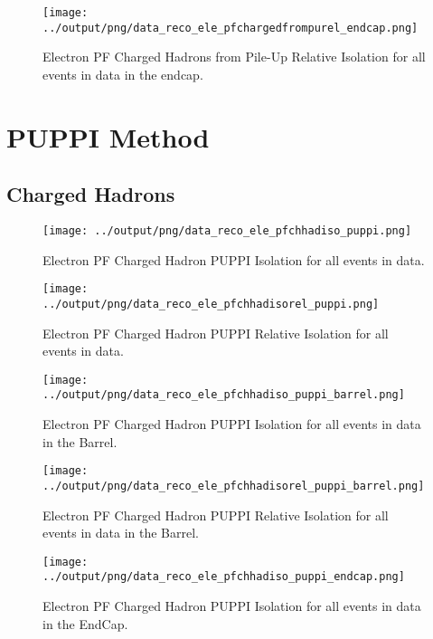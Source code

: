 \documentclass[11pt]{book}
\begin{document}
\begin{figure}[htb]
\centering
\texttt{[image: ../output/png/data\_reco\_ele\_pfchargedfrompurel\_endcap.png]}
\caption{Electron PF Charged Hadrons from Pile-Up Relative Isolation for all events in data in the endcap.}
\label{fig:data_ele_pfchargedfrompurel_endcap}
\end{figure}
\clearpage

\section{PUPPI Method}
\subsection{Charged Hadrons}
\begin{figure}[htb]
\centering
\texttt{[image: ../output/png/data\_reco\_ele\_pfchhadiso\_puppi.png]}
\caption{Electron PF Charged Hadron PUPPI Isolation for all events in data.}
\label{fig:data_ele_pfchhadiso_puppi}
\end{figure}

\begin{figure}[htb]
\centering
\texttt{[image: ../output/png/data\_reco\_ele\_pfchhadisorel\_puppi.png]}
\caption{Electron PF Charged Hadron PUPPI Relative Isolation for all events in data.}
\label{fig:data_ele_pfchhadisorel_puppi}
\end{figure}

\begin{figure}[htb]
\centering
\texttt{[image: ../output/png/data\_reco\_ele\_pfchhadiso\_puppi\_barrel.png]}
\caption{Electron PF Charged Hadron PUPPI Isolation for all events in data in the Barrel.}
\label{fig:data_ele_pfchhadiso_puppi_barrel}
\end{figure}

\begin{figure}[htb]
\centering
\texttt{[image: ../output/png/data\_reco\_ele\_pfchhadisorel\_puppi\_barrel.png]}
\caption{Electron PF Charged Hadron PUPPI Relative Isolation for all events in data in the Barrel.}
\label{fig:data_ele_pfchhadisorel_puppi_barrel}
\end{figure}

\begin{figure}[htb]
\centering
\texttt{[image: ../output/png/data\_reco\_ele\_pfchhadiso\_puppi\_endcap.png]}
\caption{Electron PF Charged Hadron PUPPI Isolation for all events in data in the EndCap.}
\label{fig:data_ele_pfchhadiso_puppi_endcap}
\end{figure}
\end{document}
